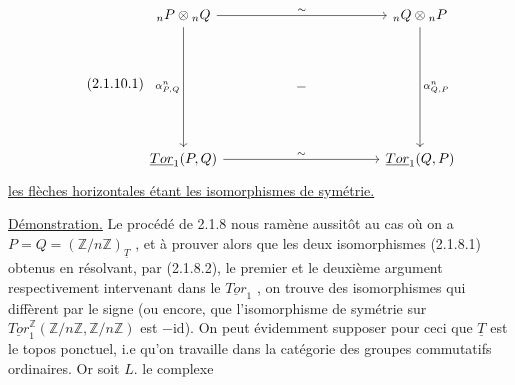\begin{equation}\tag{2.1.10.1}
\begin{tikzcd}[column sep=huge, row sep=huge]
{}_nP \otimes {}_nQ \arrow[rr, "\sim"] \arrow[dd, "{\alpha^n_{P,Q}}"'] & & {}_nQ \otimes {}_nP \arrow[dd, "{\alpha^n_{Q,P}}"] \\
 & - & \\
\underline{Tor}_1(P,Q) \arrow[rr, "\sim"] & & \underline{Tor}_1(Q,P)
\end{tikzcd}
\end{equation}
\underline{les flèches horizontales étant les isomorphismes de symétrie.}



\underline{Démonstration.} Le procédé de 2.1.8 nous ramène aussitôt au cas où on a $P=Q = (\mathbb{Z}/n\mathbb{Z})_{\underline{T}}$ , et à prouver alors que les deux isomorphismes (2.1.8.1) obtenus en résolvant, par (2.1.8.2), le premier et le deuxième argument respectivement intervenant dans le $\underline{Tor}_1$ , on trouve des isomorphismes qui diffèrent par le signe (ou encore, que l'isomorphisme de symétrie sur $\underline{Tor}_1^{\mathbb{Z}}(\mathbb{Z}/n\mathbb{Z} , \mathbb{Z}/n\mathbb{Z})$ est $-\mathrm{id}$). On peut évidemment supposer pour ceci que $\underline{T}$ est le topos ponctuel, i.e qu'on travaille dans la catégorie des groupes commutatifs ordinaires. Or soit $L.$ le complexe

